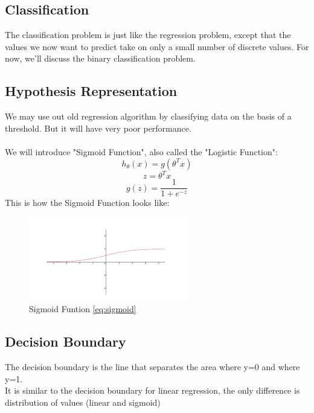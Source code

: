 \documentclass[12pt, A4]{report}
\begin{document}
  \subsection*{Classification}
    The classification problem is just like the regression problem, except that the values we now want to predict take on only a small number of discrete values. For now, we'll discuss the binary classification problem.

  \subsection*{Hypothesis Representation}
    We may use out old regression algorithm by classifying data on the basis of a threshold. But it will have very poor performance.\\ 
    \\We will introduce "Sigmoid Function", also called the "Logistic Function":
    \begin{equation}
      h_\theta(x) = g(\theta^{T}x)
    \end{equation}
    \begin{equation}
      z = \theta^{T}x
    \end{equation}
    \begin{equation}\label{eq:sigmoid}
      g(z) = \frac{1}{1+e^{-z}}
    \end{equation}
    This is how the Sigmoid Function looks like:
    \begin{figure}[h]
      \centering
      \includegraphics[scale = 1]{sigmoid.png}
      \caption{Sigmoid Funtion \ref{eq:sigmoid}}
    \end{figure}

  \subsection*{Decision Boundary}
    The decision boundary is the line that separates the area where y=0 and where y=1.\\
    It is similar to the decision boundary for linear regression, the only difference is distribution of values (linear and sigmoid)
\end{document}
